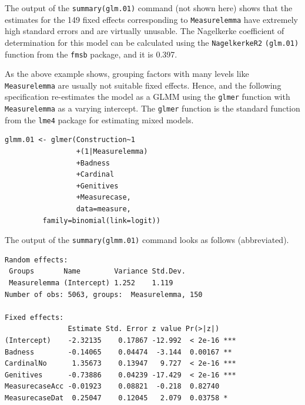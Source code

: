 The output of the \texttt{summary(glm.01)} command (not shown here) shows that the estimates for the 149 fixed effects corresponding to \texttt{Measurelemma} have extremely high standard errors and are virtually unusable.
The Nagelkerke coefficient of determination for this model can be calculated using the \texttt{NagelkerkeR2} \texttt{(glm.01)} function from the \texttt{fmsb} package, and it is 0.397.

As the above example shows, grouping factors with many levels like \texttt{Measurelemma} are usually not suitable fixed effects.
Hence, and the following specification re-estimates the model as a GLMM using the \texttt{glmer} function with \texttt{Measurelemma} as a varying intercept.
The \texttt{glmer} function is the standard function from the \texttt{lme4} package for estimating mixed models.

\vspace{0.5\baselineskip}

\begin{lstlisting}
glmm.01 <- glmer(Construction~1
                 +(1|Measurelemma)
                 +Badness
                 +Cardinal
                 +Genitives
                 +Measurecase,
                 data=measure,
		 family=binomial(link=logit))
\end{lstlisting}

The output of the \texttt{summary(glmm.01)} command looks as follows (abbreviated).

\vspace{0.5\baselineskip}

\begin{lstlisting}
Random effects:
 Groups       Name        Variance Std.Dev.
 Measurelemma (Intercept) 1.252    1.119   
Number of obs: 5063, groups:  Measurelemma, 150

Fixed effects:
               Estimate Std. Error z value Pr(>|z|)    
(Intercept)    -2.32135    0.17867 -12.992  < 2e-16 ***
Badness        -0.14065    0.04474  -3.144  0.00167 ** 
CardinalNo      1.35673    0.13947   9.727  < 2e-16 ***
Genitives      -0.73886    0.04239 -17.429  < 2e-16 ***
MeasurecaseAcc -0.01923    0.08821  -0.218  0.82740    
MeasurecaseDat  0.25047    0.12045   2.079  0.03758 *  
\end{lstlisting}

